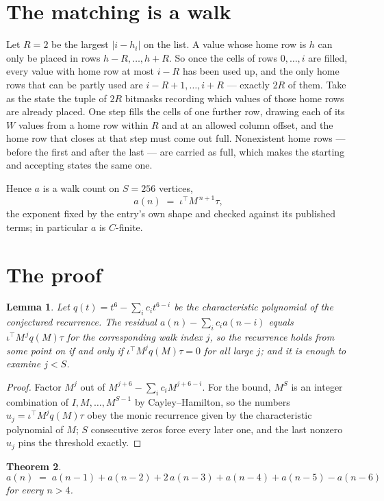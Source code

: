 \documentclass[11pt,a4paper]{article}
\theoremstyle{plain}
\newtheorem{theorem}{Theorem}
\newtheorem{lemma}[theorem]{Lemma}
\theoremstyle{definition}
\begin{document}
\section{The matching is a walk}

Let $R=2$ be the largest $|i-h_i|$ on the list. A value whose home row is $h$ can only be
placed in rows $h-R,\dots,h+R$. So once the cells of rows $0,\dots,i$ are filled, every
value with home row at most $i-R$ has been used up, and the only home rows that can be
partly used are $i-R+1,\dots,i+R$ --- exactly $2R$ of them. Take as the state the tuple of
$2R$ bitmasks recording which values of those home rows are already placed. One step fills
the cells of one further row, drawing each of its $W$ values from a home row within $R$
and at an allowed column offset, and the home row that closes at that step must come out
full. Nonexistent home rows --- before the first and after the last --- are carried as
full, which makes the starting and accepting states the same one.

Hence $a$ is a walk count on $S=256$ vertices,
\[
a(n)\;=\;\iota^{\!\top}M^{\,n+1}\tau ,
\]
the exponent fixed by the entry's own shape and checked against its published terms; in
particular $a$ is $C$-finite.

\section{The proof}

\begin{lemma}\label{lem:crit}
Let $q(t)=t^{6}-\sum_i c_it^{6-i}$ be the characteristic polynomial of the
conjectured recurrence. The residual $a(n)-\sum_ic_ia(n-i)$ equals
$\iota^{\!\top}M^{\,j}q(M)\tau$ for the corresponding walk index $j$, so the recurrence
holds from some point on if and only if $\iota^{\!\top}M^{j}q(M)\tau=0$ for all large $j$;
and it is enough to examine $j<S$.
\end{lemma}

\begin{proof}
Factor $M^{j}$ out of $M^{j+6}-\sum_ic_iM^{j+6-i}$. For the bound, $M^{S}$
is an integer combination of $I,M,\dots,M^{S-1}$ by Cayley--Hamilton, so the numbers
$u_j=\iota^{\!\top}M^{j}q(M)\tau$ obey the monic recurrence given by the characteristic
polynomial of $M$; $S$ consecutive zeros force every later one, and the last nonzero $u_j$
pins the threshold exactly.
\end{proof}

\begin{theorem}
\[
a(n)\;=\;a(n-1) + a(n-2) + 2\,a(n-3) + a(n-4) + a(n-5) - a(n-6)
\]
for every $n>4$.
\end{theorem}
\end{document}
